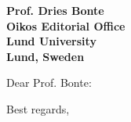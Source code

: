 \documentclass[12pt]{letter}
\begin{document}
\begin{letter}{\bf Prof. Dries Bonte\\
Oikos Editorial Office \\
Lund University \\
Lund, Sweden}


\opening{Dear Prof. Bonte:}


    \closing{Best regards,}

    \clearpage





    






\end{letter}
\end{document}
